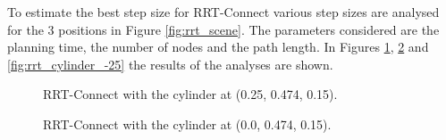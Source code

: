 \documentclass[../main.tex]{subfiles}
\begin{document}
To estimate the best step size for RRT-Connect various step sizes are analysed for the 3 positions in Figure \ref{fig:rrt_scene}. The parameters considered are the planning time, the number of nodes and the path length. In Figures \ref{fig:rrt_cylinder_25}, \ref{fig:rrt_cylinder_0} and \ref{fig:rrt_cylinder_-25} the results of the analyses are shown.
\begin{figure}[H]
    \centering
    \noindent{}
    \caption{RRT-Connect with the cylinder at (0.25, 0.474, 0.15).}
    \label{fig:rrt_cylinder_25}
\end{figure}
\begin{figure}[H]
    \centering
    \noindent{}
    \caption{RRT-Connect with the cylinder at (0.0, 0.474, 0.15).}
    \label{fig:rrt_cylinder_0}
\end{figure}
\end{document}
